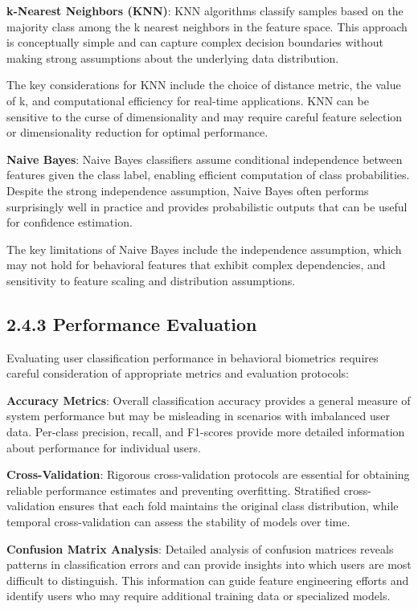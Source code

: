 \documentclass[
  12pt,
  a4paper,
]{report}
\begin{document}
\textbf{k-Nearest Neighbors (KNN)}: KNN algorithms classify samples
based on the majority class among the k nearest neighbors in the feature
space. This approach is conceptually simple and can capture complex
decision boundaries without making strong assumptions about the
underlying data distribution.

The key considerations for KNN include the choice of distance metric,
the value of k, and computational efficiency for real-time applications.
KNN can be sensitive to the curse of dimensionality and may require
careful feature selection or dimensionality reduction for optimal
performance.

\textbf{Naive Bayes}: Naive Bayes classifiers assume conditional
independence between features given the class label, enabling efficient
computation of class probabilities. Despite the strong independence
assumption, Naive Bayes often performs surprisingly well in practice and
provides probabilistic outputs that can be useful for confidence
estimation.

The key limitations of Naive Bayes include the independence assumption,
which may not hold for behavioral features that exhibit complex
dependencies, and sensitivity to feature scaling and distribution
assumptions.

\subsection{2.4.3 Performance Evaluation}\label{performance-evaluation}

Evaluating user classification performance in behavioral biometrics
requires careful consideration of appropriate metrics and evaluation
protocols:

\textbf{Accuracy Metrics}: Overall classification accuracy provides a
general measure of system performance but may be misleading in scenarios
with imbalanced user data. Per-class precision, recall, and F1-scores
provide more detailed information about performance for individual
users.

\textbf{Cross-Validation}: Rigorous cross-validation protocols are
essential for obtaining reliable performance estimates and preventing
overfitting. Stratified cross-validation ensures that each fold
maintains the original class distribution, while temporal
cross-validation can assess the stability of models over time.

\textbf{Confusion Matrix Analysis}: Detailed analysis of confusion
matrices reveals patterns in classification errors and can provide
insights into which users are most difficult to distinguish. This
information can guide feature engineering efforts and identify users who
may require additional training data or specialized models.
\end{document}
